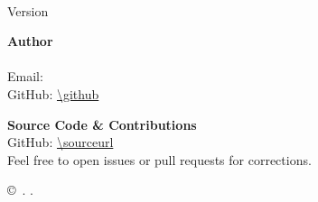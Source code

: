 \begin{flushleft}
  {\large \textbf{\displaytitle}}
  \\
  Version~\version
  \\

  \vspace{2cm}

  \textbf{Author} \\
  \name \\
  Email: \href{mailto:\email}{\texttt{\email}} \\
  GitHub: \url{\github} \\

  \vspace{1cm}

  \textbf{Source Code \& Contributions} \\
  GitHub: \url{\sourceurl} \\
  \footnotesize{Feel free to open issues or pull requests for corrections.} \\

  \vspace{1cm}

  \copyright\ \copyrightyear. \name. \\

  \vspace{0.4cm}

  \footnotesize{\license}
\end{flushleft}
